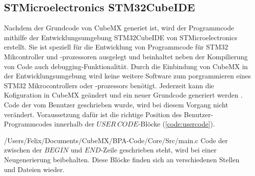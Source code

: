 
\subsection{STMicroelectronics STM32CubeIDE}
Nachdem der Grundcode von CubeMX generiet ist, wird der Programmcode mithilfe der Entwicklungsumgebung STM32CubeIDE von STMicroelectronics erstellt. Sie ist speziell für die Entwicklung von Programmcode für STM32 Mikcontroller und -prozessoren ausgelegt und beinhaltet neben der Kompilierung von Code auch debugging-Funktionalität. Durch die Einbindung von CubeMX in der Entwicklungsumgebung wird keine weitere Software zum porgrammieren eines STM32 Mikrocontrollers oder -prozessors benötigt. Jederzeit kann die Kofiguration in CubeMX geändert und ein neuer Grundcode generiert werden \cite{CubeIDE}. Code der vom Benutzer geschrieben wurde, wird bei diesem Vorgang nicht verändert. Voraussetzung dafür ist die richtige Position des Benutzer-Programmcodes innerhalb der $USER\ CODE$-Blöcke (\ref{code:usercode}).

{/Users/Felix/Documents/CubeMX/BPA-Code/Core/Src/main.c}
Code der zwischen der $BEGIN$ und $END$-Zeile geschrieben steht, wird bei einer Neugenerierung beibehalten. Diese Blöcke finden sich an verschiedenen Stellen und Dateien wieder.\\

